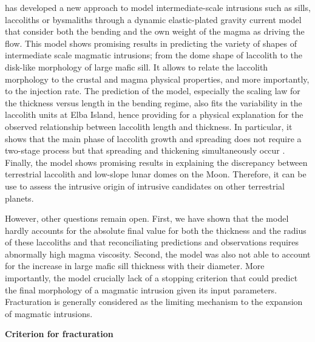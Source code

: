 \citet{Michaut:2011kg}  has   developed  a   new  approach   to  model
intermediate-scale intrusions such as  sills, laccoliths or bysmaliths
through a  dynamic elastic-plated gravity current  model that consider
both the bending and the own weight  of the magma as driving the flow.
This model shows promising results in predicting the variety of shapes
of  intermediate scale  magmatic intrusions;  from the  dome shape  of
laccolith to the disk-like morphology  of large mafic sill.  It allows
to relate the  laccolith morphology to the crustal  and magma physical
properties,  and  more  importantly,   to  the  injection  rate.   The
prediction of the model, especially  the scaling law for the thickness
versus length in the bending regime,  also fits the variability in the
laccolith  units  at  Elba  Island, hence  providing  for  a  physical
explanation for the observed relationship between laccolith length and
thickness. In  particular, it shows  that the main phase  of laccolith
growth and  spreading does  not require a  two-stage process  but that
spreading and thickening  simultaneously occur \citep{Michaut:2011kg}.
Finally,  the   model  shows  promising  results   in  explaining  the
discrepancy between terrestrial laccolith and low-slope lunar domes on
the Moon. Therefore,  it can be use to assess  the intrusive origin of
intrusive candidates on other terrestrial planets.

However, other questions  remain open.  First, we have  shown that the
model  hardly accounts  for  the  absolute final  value  for both  the
thickness and the  radius of these laccoliths  and that reconciliating
predictions and observations requires abnormally high magma viscosity.
Second, the  model was also  not able to  account for the  increase in
large mafic sill thickness with  their diameter. More importantly, the
model crucially  lack of a  stopping criterion that could  predict the
final morphology of  a magmatic intrusion given  its input parameters.
Fracturation is generally considered as  the limiting mechanism to the
expansion of magmatic intrusions.

\vspace{.5cm} \textbf{Criterion for fracturation} \vspace{.5cm}

